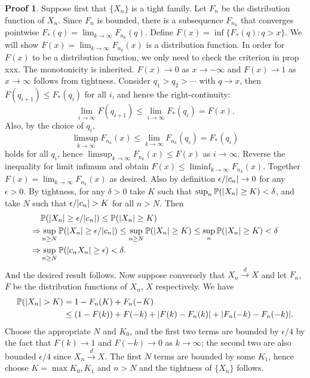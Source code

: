 \documentclass[hidelinks,11pt]{article}
\theoremstyle{definition}
\theoremstyle{dotless}
\newtheorem{prop}{Proof}[section]
\theoremstyle{remark}
\DeclareMathOperator{\1}{\mathbf{1}}
\DeclareMathOperator{\0}{\mathbf{0}}
\begin{document}
\begin{prop}
Suppose first that $\{X_n\}$ is a tight family. Let $F_n$ be the distribution function of $X_n$. Since $F_n$ is bounded, there is a subsequence $F_{n_k}$ that converges pointwise $F_\ast(q)=\lim_{k\to\infty}F_{n_k}(q)$. Define $F(x)=\inf\{F_\ast(q):q>x\}$. We will show $F(x)=\lim_{k\to\infty}F_{n_k}(x)$ is a distribution function.\medbreak
In order for $F(x)$ to be a distribution function, we only need to check the criterion in prop xxx. The monotonicity is inherited. $F(x)\to0$ as $x\to-\infty$ and $F(x)\to1$ as $x\to\infty$ follows from tightness. Consider $q_1>q_2>\cdots$ with $q\to x$, then $F(q_{i+1})\leq F_\ast(q_i)$ for all $i$, and hence the right-continuity:
\[\lim_{i\to\infty}F(q_{i+1})\leq\lim_{i\to\infty}F_\ast(q_i)=F(x).\]
Also, by the choice of $q_i$,
\[\limsup_{k\to\infty}F_{n_k}(x)\leq\lim_{k\to\infty}F_{n_k}(q_i)=F_\ast(q_i)\]
holds for all $q_i$, hence $\limsup_{k\to\infty}F_{n_k}(x)\leq F(x)$ as $i\to\infty$. Reverse the inequality for limit infimum and obtain $F(x)\leq\liminf_{k\to\infty}F_{n_k}(x)$. Together $F(x)=\lim_{k\to\infty}F_{n_k}(x)$ as desired.\medbreak
Also by definition $\epsilon/\abs{c_n}\to0$ for any $\epsilon>0$. By tightness, for any $\delta>0$ take $K$ such that $\sup_n\mathbb{P}(\abs{X_n}\geq K)<\delta$, and take $N$ such that $\epsilon/\abs{c_n}>K$ for all $n>N$. Then
\begin{align*}
    &\mathbb{P}(\abs{X_n}\geq\epsilon/\abs{c_n})\leq\mathbb{P}(\abs{X_n}\geq K)\\
    \Rightarrow&\sup_{n\geq N}\mathbb{P}(\abs{X_n}\geq\epsilon/\abs{c_n})\leq\sup_{n\geq N}\mathbb{P}(\abs{X_n}\geq K)\leq\sup_n\mathbb{P}(\abs{X_n}\geq K)<\delta\\
    \Rightarrow&\sup_{n\geq N}\mathbb{P}(\abs{c_nX_n}\geq\epsilon)<\delta.
\end{align*}
And the desired result follows.\medbreak
Now suppose conversely that $X_n\xrightarrow{d}X$ and let $F_n$, $F$ be the distribution functions of $X_n$, $X$ respectively. We have
\begin{align*}
\mathbb{P}(\abs{X_n}>K)&=1-F_n(K)+F_n(-K)\\
&\leq(1-F(k))+F(-k)+\abs{F(k)-F_n(k)}+\abs{F_n(-k)-F_n(-k)}.
\end{align*}
Choose the appropriate $N$ and $K_0$, and the first two terms are bounded by $\epsilon/4$ by the fact that $F(k)\to1$ and $F(-k)\to0$ as $k\to\infty$; the second two are also bounded $\epsilon/4$ since $X_n\xrightarrow{d}X$. The first $N$ terms are bounded by some $K_1$, hence choose $K=\max{K_0,K_1}$ and $n>N$ and the tightness of $\{X_n\}$ follows.
\end{prop}
\end{document}
